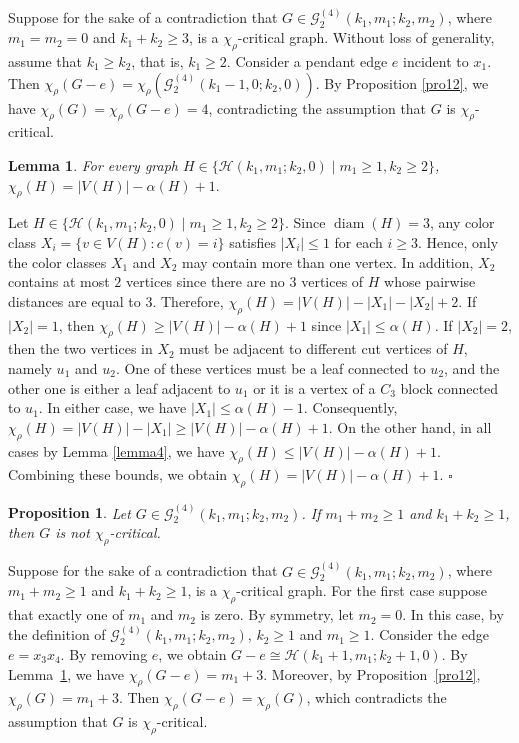 \documentclass[12pt]{article}
\newtheorem{lemma}[theorem]{Lemma}
\newtheorem{proposition}[theorem]{Proposition}
\newcommand{\proof}{\noindent{\bf Proof.\ }}
\newcommand{\qed}{\hfill $\square$ \bigskip}
\newcommand{\ie}{that is}
\begin{document}
\proof
Suppose for the sake of a contradiction that $G \in \mathcal{G}_{2}^{(4)}(k_{1},m_{1};k_{2},m_{2})$, where $m_1=m_2=0$ and $k_1+k_2 \geq 3$, is a \( \chi_\rho \)-critical graph.  Without loss of generality, assume that $k_1 \geq k_2$, \ie, $k_1 \geq 2$. Consider a pendant edge $e$ incident to $x_1$. Then  $\chi_\rho(G-e)=\chi_\rho(\mathcal{G}^{(4)}_2(k_1-1,0; k_2,0)).$ By Proposition \ref{pro12}, we have $\chi_\rho(G)=\chi_\rho(G-e)=4$, contradicting the assumption that $G$ is $\chi_\rho$-critical.

\begin{lemma}\label{lemma7}
	For every graph $H \in \{\mathcal{H}(k_1, m_1; k_2, 0) \mid m_1 \geq 1, k_2\geq 2 \}$, $\chi_\rho(H) = |V(H)|-\alpha(H)+1.$
\end{lemma}

\proof
Let $H \in \{\mathcal{H}(k_1, m_1; k_2, 0) \mid m_1 \geq 1, k_2\geq 2 \}$. 
Since $\operatorname{diam}(H)=3$, any color class $X_i=\{v\in V(H): c(v)=i\}$ satisfies $|X_i|\le 1$ for each $i\ge3$. 
Hence, only the color classes $X_1$ and $X_2$ may contain more than one vertex. In addition, $X_2$ contains at most $2$ vertices since there are no $3$ vertices of $H$ whose pairwise distances are equal to $3$. Therefore, $\chi_\rho(H)=|V(H)|-|X_1|-|X_2|+2.$ If $|X_2|=1$, then $\chi_\rho(H)\ge |V(H)|-\alpha(H)+1$ since $|X_1|\le \alpha(H)$.
If $|X_2|=2$, then the two vertices in $X_2$ must be adjacent to different cut vertices of $H$, namely $u_1$ and $u_2$. One of these vertices must be a leaf connected to $u_2$, and the other one is either a leaf adjacent to $u_1$ or it is a vertex of a $C_3$ block connected to $u_1$. In either case, we have $|X_1|\le \alpha(H)-1$.
Consequently, $\chi_\rho(H)=|V(H)|-|X_1|\ge |V(H)|-\alpha(H)+1.$ On the other hand, in all cases by Lemma \ref{lemma4}, we have 
$\chi_\rho(H)\leq |V(H)|-\alpha(H)+1.$
Combining these bounds, we obtain
$\chi_\rho(H)=|V(H)|-\alpha(H)+1.$
\qed


\begin{proposition}\label{pro16}
Let $G \in \mathcal{G}_{2}^{(4)}(k_{1},m_{1};k_{2},m_{2})$. If $m_1+m_2 \geq 1$ and $k_1+k_2 \geq 1$, then $G$ is not $\chi_{\rho}$-critical. 
\end{proposition}

\proof
Suppose for the sake of a contradiction that $G \in \mathcal{G}_{2}^{(4)}(k_{1},m_{1};k_{2},m_{2})$, where $m_1+m_2 \geq 1$ and $k_1+k_2 \geq 1$, is a \( \chi_\rho \)-critical graph. 
For the first case suppose that exactly one of $m_1$ and $m_2$ is zero. By symmetry, let $m_2=0$. In this case, by the definition of $\mathcal{G}_{2}^{(4)}(k_{1},m_{1};k_{2},m_{2})$, $k_2 \ge 1$ and $m_1 \ge 1$. 
Consider the edge $e = x_3x_4$. 
By removing $e$, we obtain $G - e \cong \mathcal{H}(k_1 + 1, m_1; k_2 + 1, 0).$
By Lemma~\ref{lemma7}, we have $\chi_\rho(G - e) = m_1 + 3$. 
Moreover, by Proposition~\ref{pro12}, $\chi_\rho(G) = m_1 + 3$. 
Then $\chi_\rho(G - e) = \chi_\rho(G)$, which contradicts the assumption that $G$ is $\chi_\rho$-critical.
\end{document}
